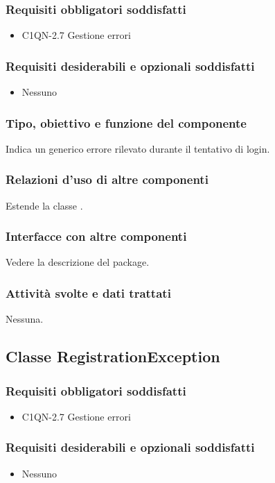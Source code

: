 \subsubsection*{Requisiti obbligatori soddisfatti}
\begin{itemize}
	\item C1QN-2.7 Gestione errori
\end{itemize}
\subsubsection*{Requisiti desiderabili e opzionali soddisfatti}
\begin{itemize}
    \item Nessuno
\end{itemize}
\subsubsection*{Tipo, obiettivo e funzione del componente}
Indica un generico errore rilevato durante il tentativo di login.
\subsubsection*{Relazioni d'uso di altre componenti}
Estende la classe .
\subsubsection*{Interfacce con altre componenti}
Vedere la descrizione del package.
\subsubsection*{Attivit\`a svolte e dati trattati}
Nessuna.

\subsection{Classe RegistrationException}
\subsubsection*{Requisiti obbligatori soddisfatti}
\begin{itemize}
	\item C1QN-2.7 Gestione errori
\end{itemize}
\subsubsection*{Requisiti desiderabili e opzionali soddisfatti}
\begin{itemize}
    \item Nessuno
\end{itemize}
